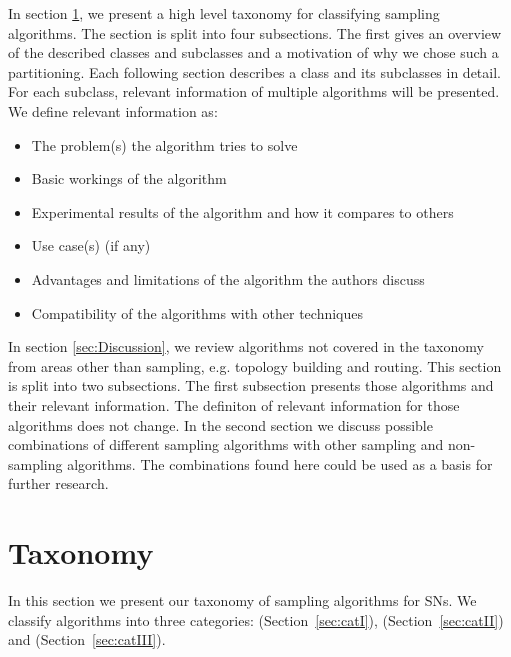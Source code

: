   In section \ref{sec:Taxonomy}, we present a
high level taxonomy for classifying sampling algorithms. The section is split
into four subsections. The first gives an overview of the described classes and
subclasses and a motivation of why we chose such a partitioning. Each following
section describes a class and its subclasses in detail. For each subclass,
relevant information of multiple algorithms will be presented. We define
relevant information as:
\begin{itemize}
	\item The problem(s) the algorithm tries to solve
	\item Basic workings of the algorithm
	\item Experimental results of the algorithm and how it compares to others
	\item Use case(s) (if any)
	\item Advantages and limitations of the algorithm the authors discuss
	\item Compatibility of the algorithms with other techniques
\end{itemize}   


 In section \ref{sec:Discussion}, we review
algorithms not covered in the taxonomy from areas other than sampling, e.g.
topology building and routing. This section is split into two subsections. The
first subsection presents those algorithms and their relevant information. The
definiton of relevant information for those algorithms does not change. In the
second section we discuss possible combinations of different sampling
algorithms with other sampling and non-sampling algorithms. The combinations
found here could be used as a basis for further research.


\section{Taxonomy}
\label{sec:Taxonomy}

In this section we present our taxonomy of sampling algorithms for \acp{SN}. We
classify algorithms into three categories: \catI (Section~\ref{sec:catI}),
\catII (Section~\ref{sec:catII})  and \catIII (Section~\ref{sec:catIII}).


